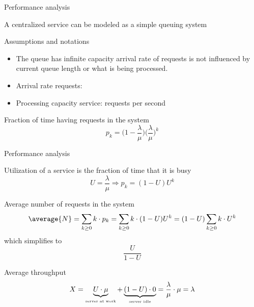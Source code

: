   \begin{slide}{Performance analysis}
    \begin{block}{A centralized service can be modeled as a simple queuing system}
      \centering{}
    \end{block}
    \begin{block}{Assumptions and notations}
      \begin{itemize}\tightlist
      \item The queue has infinite capacity \mathexpr{\Rightarrow} arrival rate of requests is not influenced
        by current queue length or what is being processed.
      \item Arrival rate requests: \mathexpr{\lambda}
      \item Processing capacity service: \mathexpr{\mu} requests per second
      \end{itemize}
    \end{block}
    \begin{alertblock}{Fraction of time having  requests in the system}
      \[ p_k = \bigl(1 - \frac{\lambda}{\mu}\bigr)\bigl(\frac{\lambda}{\mu}\bigr)^k \]
    \end{alertblock}
  \end{slide}
  \begin{slide}{Performance analysis}
    \begin{block}{Utilization  of a service is the fraction of time that it is busy}
      \[ U = \frac{\lambda}{\mu} \Rightarrow p_k = (1-U) U^k \]
    \end{block}
    \begin{block}{Average number of requests in the system}
      \[ \average{N} = \sum_{k\geq 0} k \cdot p_k = \sum_{k \geq 0} k \cdot (1-U)U^k = (1-U)\sum_{k\geq 0} k\cdot U^k \]
      which simplifies to \[ \frac{U}{1-U} \]
    \end{block}
    \begin{block}{Average throughput}
      \[ X = \underbrace{U \cdot \mu}_{\mbox{\tiny server at work}} + \underbrace{(1-U) \cdot 0}_{\mbox{\tiny
        server idle}} = \frac{\lambda}{\mu} \cdot \mu = \lambda \]
    \end{block}
  \end{slide}
